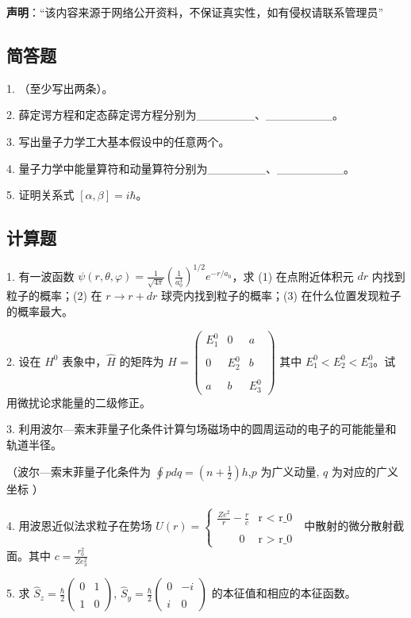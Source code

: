 
\textbf{声明}：“该内容来源于网络公开资料，不保证真实性，如有侵权请联系管理员”

\subsection{简答题}

1. （至少写出两条）。

2. 薛定谔方程和定态薛定谔方程分别为_______、________。

3. 写出量子力学工大基本假设中的任意两个。

4. 量子力学中能量算符和动量算符分别为_______、________。

5. 证明关系式 $[\alpha, \beta] = i \hbar$。

\subsection{计算题}

1. 有一波函数 $\psi(r, \theta, \varphi) = \frac{1}{\sqrt{4 \pi}} \left( \frac{1}{a_0^3} \right)^{1/2} e^{-r/a_0}$，求 (1) 在点附近体积元 $dr$ 内找到粒子的概率；(2) 在 $r \to r + dr$ 球壳内找到粒子的概率；(3) 在什么位置发现粒子的概率最大。

2. 设在 $H^0$ 表象中，$\hat{H}$ 的矩阵为
$\hat{H} = \begin{pmatrix}E_1^0 & 0 & a \\\\0 & E_2^0 & b \\\\a & b & E_3^0\end{pmatrix}$
其中 $E_1^0 < E_2^0 < E_3^0$。试用微扰论求能量的二级修正。

3. 利用波尔—索末菲量子化条件计算匀场磁场中的圆周运动的电子的可能能量和轨道半径。

（波尔—索末菲量子化条件为 $\oint p dq = (n + \frac{1}{2}) h$,$p$ 为广义动量, $q$ 为对应的广义坐标 ）

4. 用波恩近似法求粒子在势场 $U(r) = \begin{cases} 
\frac{Ze^2}{r} - \frac{r}{c} & \text {r < r_0 }\\\\
\qquad0 & \text{r > r_0 }
\end{cases}$ 中散射的微分散射截面。其中
$c = \frac{r_0^2}{Ze_3^2}$

5. 求 $\hat{S}_z = \frac{\hbar}{2} \begin{pmatrix}
0 & 1 \\\\
1 & 0
\end{pmatrix}$, $\hat{S}_y = \frac{\hbar}{2} \begin{pmatrix}
0 & -i \\\\
i & 0
\end{pmatrix}$ 的本征值和相应的本征函数。

